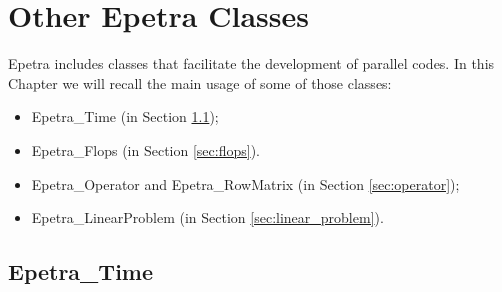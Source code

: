 % 
% 
% 
%  
%  
% 

\chapter{Other Epetra Classes}
\label{chap:epetra_others}


\begin{introchapter}
Epetra includes classes that facilitate the development of parallel
codes. In this Chapter we will recall the main usage of some of those
classes:
\begin{itemize}
\item Epetra\_Time (in Section \ref{sec:time});
\item Epetra\_Flops (in Section \ref{sec:flops}).
\item Epetra\_Operator and Epetra\_RowMatrix (in Section \ref{sec:operator});
\item Epetra\_LinearProblem (in Section \ref{sec:linear_problem}).
\end{itemize}
\end{introchapter}


\section{Epetra\_Time}
\label{sec:time}


